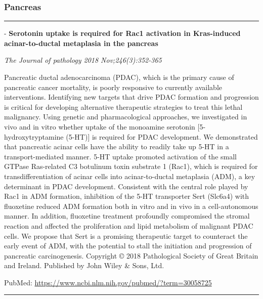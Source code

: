 \documentclass[]{article}
\begin{document}
\hypertarget{pancreas-2}{%
\subsubsection{Pancreas}\label{pancreas-2}}

\begin{center}\rule{0.5\linewidth}{\linethickness}\end{center}

 - \textbf{Serotonin uptake is required for Rac1 activation in
Kras-induced acinar-to-ductal metaplasia in the pancreas}

\emph{The Journal of pathology 2018 Nov;246(3):352-365}

Pancreatic ductal adenocarcinoma (PDAC), which is the primary cause of
pancreatic cancer mortality, is poorly responsive to currently available
interventions. Identifying new targets that drive PDAC formation and
progression is critical for developing alternative therapeutic
strategies to treat this lethal malignancy. Using genetic and
pharmacological approaches, we investigated in vivo and in vitro whether
uptake of the monoamine serotonin {[}5-hydroxytryptamine (5-HT){]} is
required for PDAC development. We demonstrated that pancreatic acinar
cells have the ability to readily take up 5-HT in a transport-mediated
manner. 5-HT uptake promoted activation of the small GTPase Ras-related
C3 botulinum toxin substrate 1 (Rac1), which is required for
transdifferentiation of acinar cells into acinar-to-ductal metaplasia
(ADM), a key determinant in PDAC development. Consistent with the
central role played by Rac1 in ADM formation, inhibition of the 5-HT
transporter Sert (Slc6a4) with fluoxetine reduced ADM formation both in
vitro and in vivo in a cell-autonomous manner. In addition, fluoxetine
treatment profoundly compromised the stromal reaction and affected the
proliferation and lipid metabolism of malignant PDAC cells. We propose
that Sert is a promising therapeutic target to counteract the early
event of ADM, with the potential to stall the initiation and progression
of pancreatic carcinogenesis. Copyright © 2018 Pathological Society of
Great Britain and Ireland. Published by John Wiley \& Sons, Ltd.

PubMed: \url{https://www.ncbi.nlm.nih.gov/pubmed/?term=30058725}

{}

{}

\begin{center}\rule{0.5\linewidth}{\linethickness}\end{center}
\end{document}
